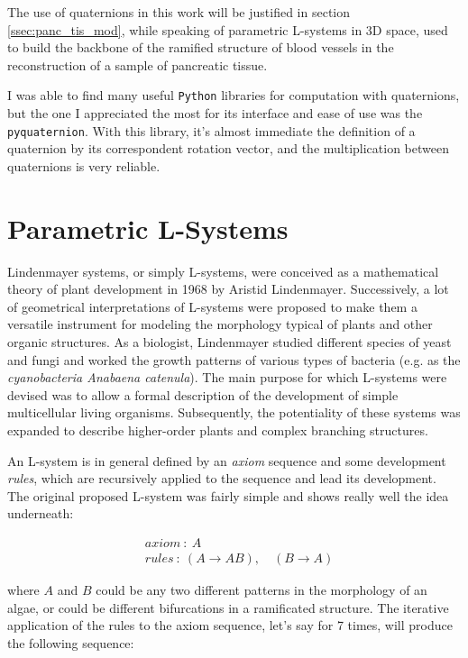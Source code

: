     The use of quaternions in this work will be justified in section \ref{ssec:panc_tis_mod}, while speaking of parametric L-systems in 3D space, used to build the backbone of the ramified structure of blood vessels in the reconstruction of a sample of pancreatic tissue.

    I was able to find many useful \texttt{Python} libraries for computation with quaternions, but the one I appreciated the most for its interface and ease of use was the \texttt{pyquaternion}. With this library, it's almost immediate the definition of a quaternion by its correspondent rotation vector, and the multiplication between quaternions is very reliable.

\section{Parametric L-Systems} \label{ssec:Lsys}
    Lindenmayer systems, or simply L-systems,  were conceived as a mathematical theory of plant development \cite{lindenmayer1968mathematical} in 1968 by Aristid Lindenmayer. Successively, a lot of geometrical interpretations of L-systems were proposed to make them a versatile instrument for modeling the morphology typical of plants and other organic structures. As a biologist, Lindenmayer studied different species of yeast and fungi and worked the growth patterns of various types of bacteria (e.g. as the \textit{cyanobacteria Anabaena catenula}). The main purpose for which L-systems were devised was to allow a formal description of the development of simple multicellular living organisms. Subsequently, the potentiality of these systems was expanded to describe higher-order plants and complex branching structures.

    An L-system is in general defined by an \textit{axiom} sequence and some development \textit{rules}, which are recursively applied to the sequence and lead its development. The original proposed L-system was fairly simple and shows really well the idea underneath:

    \begin{align}
        & axiom\ :\ A \nonumber \\
        & rules\ :\ (A \rightarrow AB),\quad(B \rightarrow A) \nonumber
    \end{align}

    where $A$ and $B$ could be any two different patterns in the morphology of an algae, or could be different bifurcations in a ramificated structure. The iterative application of the rules to the axiom sequence, let's say for 7 times, will produce the following sequence:


